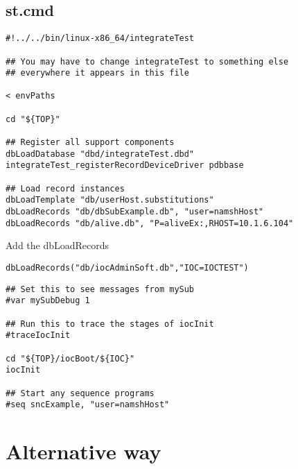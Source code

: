 \documentclass[11pt
  , a4paper
  , article
  , oneside
]{memoir}
\begin{document}
\subsection{st.cmd}
\begin{lstlisting}[style=termstyle]
#!../../bin/linux-x86_64/integrateTest

## You may have to change integrateTest to something else
## everywhere it appears in this file

< envPaths

cd "${TOP}"

## Register all support components
dbLoadDatabase "dbd/integrateTest.dbd"
integrateTest_registerRecordDeviceDriver pdbbase

## Load record instances
dbLoadTemplate "db/userHost.substitutions"
dbLoadRecords "db/dbSubExample.db", "user=namshHost"
dbLoadRecords "db/alive.db", "P=aliveEx:,RHOST=10.1.6.104"
\end{lstlisting}
Add the dbLoadRecords
\begin{lstlisting}[style=termstyle]
dbLoadRecords("db/iocAdminSoft.db","IOC=IOCTEST")
\end{lstlisting}
\begin{lstlisting}[style=termstyle]
## Set this to see messages from mySub
#var mySubDebug 1

## Run this to trace the stages of iocInit
#traceIocInit

cd "${TOP}/iocBoot/${IOC}"
iocInit

## Start any sequence programs
#seq sncExample, "user=namshHost"

\end{lstlisting}
\section{Alternative way}
\end{document}
